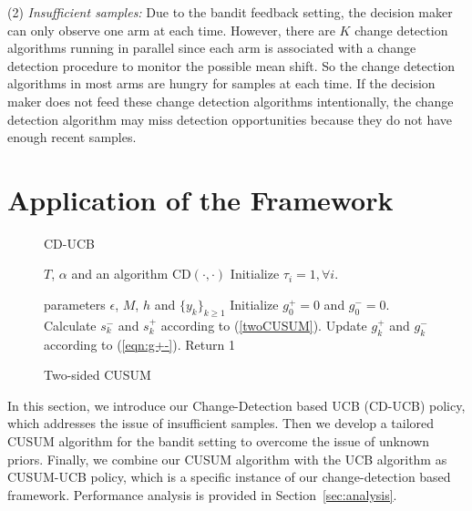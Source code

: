 \documentclass[letterpaper]{article}
\newcommand{\blue}{}
\begin{document}
(2) \emph{Insufficient samples:} Due to the bandit feedback setting,
the decision maker can only observe one arm at each time. However,
there are $K$ change detection algorithms running in parallel since
each arm is associated with a change detection procedure to monitor
the possible mean shift. So the change detection algorithms in most
arms are hungry for samples at each time. If the decision maker does
not feed these change detection algorithms intentionally, the change
detection algorithm may miss detection opportunities because they do
not have enough recent samples.


\section{Application of the Framework}\label{sec:algorithm}
\begin{figure}
  \centering
\begin{minipage}{.49\textwidth}
\begin{algorithm}[H]
\caption{CD-UCB}
\label{alg:CD-UCB}
\begin{algorithmic}
\REQUIRE $T$, $\alpha$ and an algorithm CD$(\cdot,\cdot)$
\STATE Initialize $\tau_i=1, \forall i$.
\STATE{{\blue Play arm $I_t$ and observe $X_t(I_t)$.}}
\ENDIF
\ENDFOR
\end{algorithmic}
\end{algorithm}
\end{minipage} \hfill
\begin{minipage}{.49\textwidth}
  \begin{algorithm}[H]
 \caption{Two-sided CUSUM}
\label{alg:CUSUM}
\begin{algorithmic}
\REQUIRE parameters $\epsilon$, $M$, $h$ and $\{y_k\}_{k\geq 1}$
\STATE Initialize $g_0^+=0$ and $g_0^-=0$.
\STATE Calculate $s_k^-$ and $s_k^+$ according to (\ref{twoCUSUM}).%
\STATE Update $g_k^+$ and $g_k^-$ according to (\ref{eqn:g+-}). %
\STATE Return 1
\ENDIF
\ENDFOR
\end{algorithmic}
\end{algorithm}
\end{minipage}
\end{figure}

In this section, we introduce our Change-Detection based UCB (CD-UCB) policy, which addresses the issue of insufficient samples. Then we develop a tailored CUSUM algorithm for the bandit setting to overcome the issue of unknown priors. Finally, we combine our CUSUM algorithm with the UCB algorithm as CUSUM-UCB policy, which is a specific instance of our change-detection based framework. Performance analysis is provided in Section~\ref{sec:analysis}.
\end{document}
